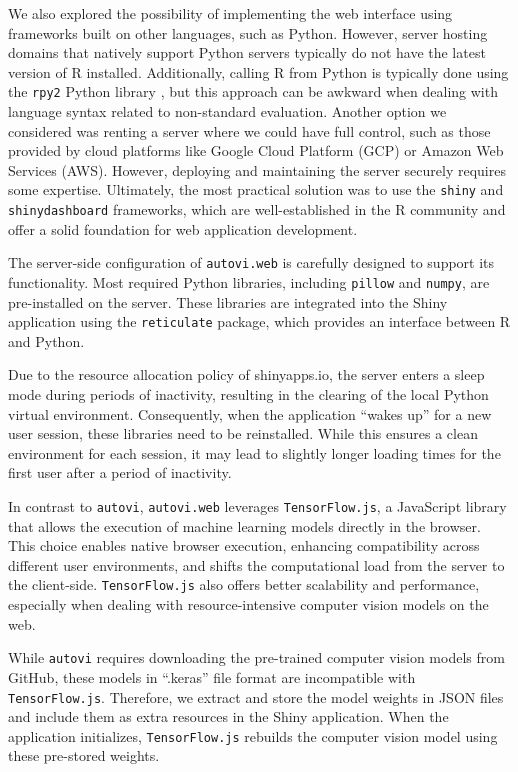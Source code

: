 \documentclass[
doublespace,
  times]{anzsauth}
\begin{document}
We also explored the possibility of implementing the web interface using
frameworks built on other languages, such as Python. However, server
hosting domains that natively support Python servers typically do not
have the latest version of R installed. Additionally, calling R from
Python is typically done using the \texttt{rpy2} Python library
\citep{rpy2}, but this approach can be awkward when dealing with
language syntax related to non-standard evaluation. Another option we
considered was renting a server where we could have full control, such
as those provided by cloud platforms like Google Cloud Platform (GCP) or
Amazon Web Services (AWS). However, deploying and maintaining the server
securely requires some expertise. Ultimately, the most practical
solution was to use the \texttt{shiny} and \texttt{shinydashboard}
frameworks, which are well-established in the R community and offer a
solid foundation for web application development.

The server-side configuration of \texttt{autovi.web} is carefully
designed to support its functionality. Most required Python libraries,
including \texttt{pillow} and \texttt{numpy}, are pre-installed on the
server. These libraries are integrated into the Shiny application using
the \texttt{reticulate} package, which provides an interface between R
and Python.

Due to the resource allocation policy of shinyapps.io, the server enters
a sleep mode during periods of inactivity, resulting in the clearing of
the local Python virtual environment. Consequently, when the application
``wakes up'' for a new user session, these libraries need to be
reinstalled. While this ensures a clean environment for each session, it
may lead to slightly longer loading times for the first user after a
period of inactivity.

In contrast to \texttt{autovi}, \texttt{autovi.web} leverages
\texttt{TensorFlow.js}, a JavaScript library that allows the execution
of machine learning models directly in the browser. This choice enables
native browser execution, enhancing compatibility across different user
environments, and shifts the computational load from the server to the
client-side. \texttt{TensorFlow.js} also offers better scalability and
performance, especially when dealing with resource-intensive computer
vision models on the web.

While \texttt{autovi} requires downloading the pre-trained computer
vision models from GitHub, these models in ``.keras'' file format are
incompatible with \texttt{TensorFlow.js}. Therefore, we extract and
store the model weights in JSON files and include them as extra
resources in the Shiny application. When the application initializes,
\texttt{TensorFlow.js} rebuilds the computer vision model using these
pre-stored weights.
\end{document}
